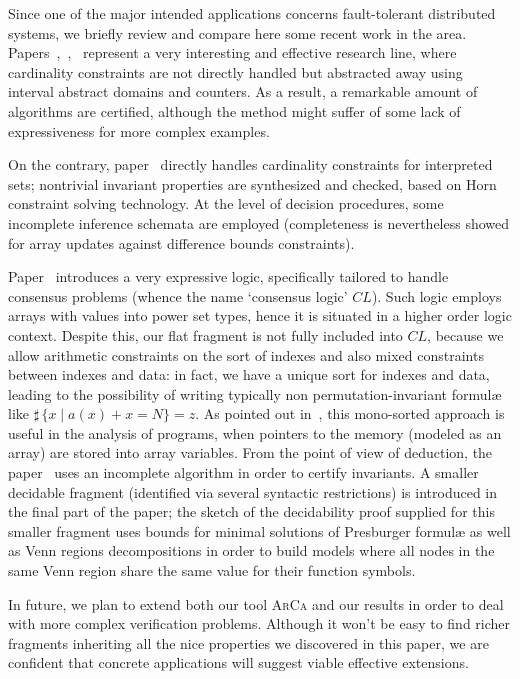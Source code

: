 \documentclass[11pt,a4paper]{article}
\newcommand{\formulae}{formul\ae\xspace}
\begin{document}
{ Since one of the major intended applications concerns fault-tolerant distributed systems, we  briefly review and compare here some recent work in the area.
Papers~\cite{konnov_cav},~\cite{konnov_concur},~\cite{konnov_fmcad} represent a very interesting and effective research line, where cardinality constraints are not directly handled but abstracted away 
using interval abstract domains and counters. As a result, a remarkable amount of algorithms are certified, although the method might suffer of some lack of expressiveness for more complex examples.

On the contrary, paper~\cite{sharpie} directly handles cardinality constraints for interpreted sets; nontrivial  invariant properties are synthesized and checked, 
based on Horn constraint solving technology. At the level of decision procedures, some incomplete inference schemata are employed (completeness is nevertheless showed for 
array updates against difference bounds constraints).

Paper~\cite{consensus} introduces a very expressive logic, specifically tailored to handle consensus problems (whence the name `consensus logic' $CL$). Such logic employs arrays with values into power set types, hence it is
situated in a higher order logic context. Despite this, our flat fragment is not fully included into $CL$, because we allow arithmetic constraints on the sort of 
indexes  and also mixed constraints between indexes and data: in fact, we have a unique sort for indexes and data, leading to the possibility of writing typically non permutation-invariant \formulae like $\sharp \,\{x \mid a(x) + x = N\} = z$. As pointed out in~\cite{AlbertiGS14}, this mono-sorted approach is useful in the analysis of programs, when pointers to the memory (modeled
as an array) are stored into array variables. From the point of view of deduction, the paper~\cite{consensus} uses an incomplete algorithm in order to certify   invariants. A smaller decidable fragment (identified via several syntactic restrictions) is introduced in the final part of the paper; 
the sketch of the decidability proof supplied for this smaller fragment uses bounds for minimal solutions of Presburger \formulae as well as Venn regions decompositions in order to build models 
where all  nodes in the same Venn region share the same value for their function symbols.

In future, we plan to extend both our tool \textsc{ArCa} and our results in order  to deal with more complex verification problems. Although it won't be easy to find richer fragments inheriting all the nice properties we discovered in this paper, we are confident that concrete applications will suggest viable effective extensions.

}
\end{document}
